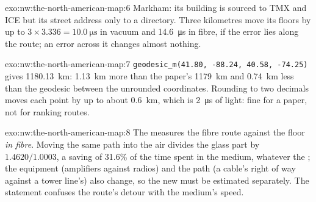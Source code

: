 \begin{solution}{exo:nw:the-north-american-map:6}
Markham: its building is sourced to TMX and ICE but its street address only to a directory. Three kilometres move its floors by up to
$3 \times 3.336 = \qty{10.0}{\micro\second}$ in vacuum and \qty{14.6}{\micro\second} in fibre, if the error lies along the route; an error across
it changes almost nothing.
\end{solution}

\begin{solution}{exo:nw:the-north-american-map:7}
\texttt{geodesic\_m(41.80, -88.24, 40.58, -74.25)} gives \qty{1180.13}{\kilo\metre}: \qty{1.13}{\kilo\metre} more than the paper's
\qty{1179}{\kilo\metre} and \qty{0.74}{\kilo\metre} less than the geodesic between the unrounded coordinates. Rounding to two decimals moves each
point by up to about \qty{0.6}{\kilo\metre}, which is \qty{2}{\micro\second} of light: fine for a paper, not for ranking routes.
\end{solution}

\begin{solution}{exo:nw:the-north-american-map:8}
The  measures the fibre route against the floor \emph{in fibre}. Moving the same path into the air divides the glass part by
$1.4620/1.0003$, a saving of 31.6\% of the time spent in the medium, whatever the ; the equipment (amplifiers against radios) and the
path (a cable's right of way against a tower line's) also change, so the new  must be estimated separately. The statement confuses
the route's detour with the medium's speed.
\end{solution}

